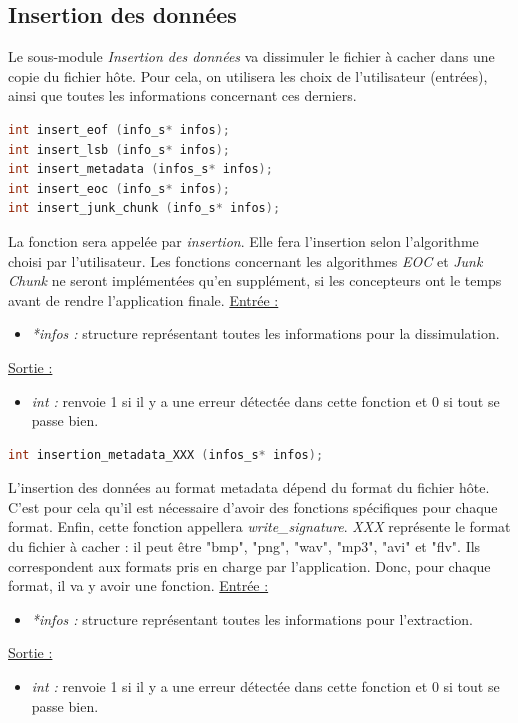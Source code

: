 \documentclass[11pt]{article}
\begin{document}
\subsection{Insertion des données}

Le sous-module \textit{Insertion des données} va dissimuler 
le fichier à cacher dans une copie du fichier hôte. Pour cela, on utilisera 
les choix de l'utilisateur (entrées), ainsi que toutes les informations 
concernant ces derniers. 

\begin{lstlisting}[language=c]
int insert_eof (info_s* infos); 
int insert_lsb (info_s* infos);
int insert_metadata (infos_s* infos);
int insert_eoc (info_s* infos);
int insert_junk_chunk (info_s* infos);
\end{lstlisting}

La fonction sera appelée par \textit{insertion}.
Elle fera l'insertion selon l'algorithme choisi par l'utilisateur. 
Les fonctions concernant les algorithmes \textit{EOC} et \textit{Junk Chunk} 
ne seront implémentées qu'en supplément, si les concepteurs ont le temps 
avant de rendre l'application finale. 
\newline
\underline{Entrée :} 
\begin{itemize}
\item \textit{*infos :} structure représentant toutes les informations pour 
la dissimulation.  
\end{itemize}
\underline{Sortie :} 
\begin{itemize}
\item \textit{int :} renvoie 1 si il y a une erreur détectée dans cette 
fonction et 0 si tout se passe bien.  
\newline 
\end{itemize}

\begin{lstlisting}[language=c]
int insertion_metadata_XXX (infos_s* infos);
\end{lstlisting}

L'insertion des données au format metadata dépend du format du fichier hôte. 
C'est pour cela qu'il est nécessaire d'avoir des fonctions spécifiques pour 
chaque format. 
Enfin, cette fonction appellera \textit{write\_signature}.
\textit{XXX} représente le format du fichier à cacher : il peut être 
"bmp", "png", "wav", "mp3", "avi" et "flv". Ils correspondent aux formats 
pris en charge par l'application. Donc, pour chaque format, il va y avoir 
une fonction.  
\newline
\underline{Entrée :} 
\begin{itemize}
\item \textit{*infos :} structure représentant toutes les informations pour 
l'extraction. 
\end{itemize}
\underline{Sortie :} 
\begin{itemize}
\item \textit{int :} renvoie 1 si il y a une erreur détectée dans cette 
fonction et 0 si tout se passe bien.  
\newline 
\end{itemize}
\end{document}
